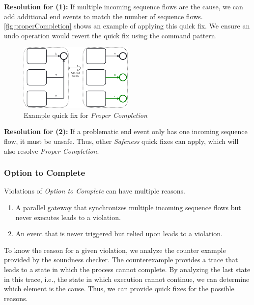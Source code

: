\documentclass[runningheads]{llncs}
\begin{document}
\textbf{Resolution for (1):} If multiple incoming sequence flows are the cause, we can add additional end events to match the number of sequence flows.
\autoref{fig:properCompletion} shows an example of applying this quick fix.
We ensure an undo operation would revert the quick fix using the command pattern.

\begin{figure}[ht]
	\centering
	\includegraphics[width=0.5\textwidth]{images/properCompletion}
	\caption{Example quick fix for \textit{Proper Completion}}
	\label{fig:properCompletion}
\end{figure}

\textbf{Resolution for (2):} If a problematic end event only has one incoming sequence flow, it must be unsafe.
Thus, other \textit{Safeness} quick fixes can apply, which will also resolve \textit{Proper Completion}.


\subsubsection{Option to Complete}
Violations of \textit{Option to Complete} can have multiple reasons.

\begin{enumerate}
	\item A parallel gateway that synchronizes multiple incoming sequence flows but never executes leads to a violation.
	\item An event that is never triggered but relied upon leads to a violation.
\end{enumerate}

To know the reason for a given violation, we analyze the counter example provided by the soundness checker.
The counterexample provides a trace that leads to a state in which the process cannot complete.
By analyzing the last state in this trace, i.e., the state in which execution cannot continue, we can determine which element is the cause.
Thus, we can provide quick fixes for the possible reasons.
\end{document}
